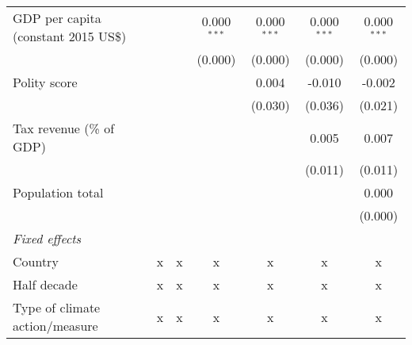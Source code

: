 \begin{tabular}{lcccccc}
   GDP per capita (constant 2015 US\$)                                                                 &         &                & 0.000$^{***}$  & 0.000$^{***}$  & 0.000$^{***}$  & 0.000$^{***}$\\   
                                                                                                       &         &                & (0.000)        & (0.000)        & (0.000)        & (0.000)\\   
   Polity score                                                                                        &         &                &                & 0.004          & -0.010         & -0.002\\   
                                                                                                       &         &                &                & (0.030)        & (0.036)        & (0.021)\\   
   Tax revenue (\% of GDP)                                                                             &         &                &                &                & 0.005          & 0.007\\   
                                                                                                       &         &                &                &                & (0.011)        & (0.011)\\   
   Population total                                                                                    &         &                &                &                &                & 0.000\\   
                                                                                                       &         &                &                &                &                & (0.000)\\   
   \emph{Fixed effects}\\
   Country                                                                                             & x       & x              & x              & x              & x              & x\\  
   Half decade                                                                                         & x       & x              & x              & x              & x              & x\\  
   Type of climate action/measure                                                                      & x       & x              & x              & x              & x              & x\\  

\end{tabular}
